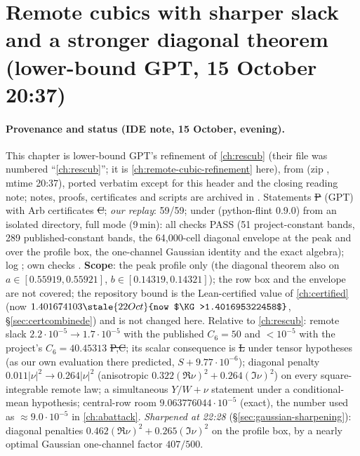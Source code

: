 \section{Remote cubics with sharper slack and a stronger diagonal theorem (lower-bound GPT, 15 October 20:37)}
\label{ch:remote-cubic-refinement}

\paragraph{Provenance and status (IDE note, 15 October, evening).} This chapter is lower-bound GPT's refinement of \autoref{ch:rescub} (their file was numbered ``\autoref{ch:rescub}''; it is
\autoref{ch:remote-cubic-refinement} here), from  (zip ,
mtime 20:37), ported verbatim except for this header and the closing reading note; notes, proofs, certificates and scripts are archived in
. Statements \st{P} (GPT) with Arb certificates \st{C}; \emph{our replay}:  59/59;
 under  (python-flint 0.9.0) from an isolated directory, full mode (9\,min): all checks PASS (51 project-constant bands, 289 published-constant bands, the
64,000-cell diagonal envelope at the peak and over the profile box, the one-channel Gaussian identity and the exact algebra); log ; own checks
. \textbf{Scope}: the peak profile only (the diagonal theorem also on $a\in[0.55919,0.55921]$, $b\in[0.14319,0.14321]$); the row box and the envelope are not
covered; the repository bound is the Lean-certified value of \autoref{ch:certified} (now $1.401674103\stale{22 Oct}{now $\KG>1.401695322458$}$, \S\ref{sec:certcombinede}) and is not changed here. Relative to \autoref{ch:rescub}: remote slack $2.2\cdot10^{-5}\to1.7\cdot10^{-5}$
with the published $C_6=50$ and $<10^{-5}$ with the project's $C_6=40.45313$ \st{P,C}; its scalar consequence is \st{L} under tensor hypotheses (as our own evaluation there predicted, $S+9.77\cdot10^{-6}$); diagonal penalty $0.011|\nu|^2\to0.264|\nu|^2$
(anisotropic $0.322(\Re\nu)^2+0.264(\Im\nu)^2$) on every square-integrable remote law; a simultaneous $Y/W+\nu$ statement under a conditional-mean hypothesis; central-row room
$9.063776044\cdot10^{-5}$ (exact), the number used as $\approx9.0\cdot10^{-5}$ in \autoref{ch:abattack}. \emph{Sharpened at 22:28} (\S\ref{sec:gaussian-sharpening}): diagonal penalties $0.462(\Re\nu)^2+0.265(\Im\nu)^2$ on the profile box, by a nearly optimal Gaussian one-channel factor $407/500$.

